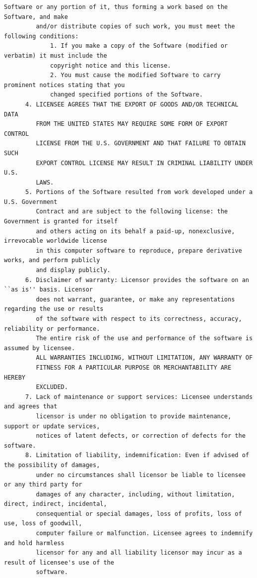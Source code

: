 \begin{lstlisting}[basicstyle=\ttfamily\footnotesize,breaklines=true]
         Software or any portion of it, thus forming a work based on the Software, and make
         and/or distribute copies of such work, you must meet the following conditions:
             1. If you make a copy of the Software (modified or verbatim) it must include the
             copyright notice and this license.
             2. You must cause the modified Software to carry prominent notices stating that you
             changed specified portions of the Software.
      4. LICENSEE AGREES THAT THE EXPORT OF GOODS AND/OR TECHNICAL DATA
         FROM THE UNITED STATES MAY REQUIRE SOME FORM OF EXPORT CONTROL
         LICENSE FROM THE U.S. GOVERNMENT AND THAT FAILURE TO OBTAIN SUCH
         EXPORT CONTROL LICENSE MAY RESULT IN CRIMINAL LIABILITY UNDER U.S.
         LAWS.
      5. Portions of the Software resulted from work developed under a U.S. Government
         Contract and are subject to the following license: the Government is granted for itself
         and others acting on its behalf a paid-up, nonexclusive, irrevocable worldwide license
         in this computer software to reproduce, prepare derivative works, and perform publicly
         and display publicly.
      6. Disclaimer of warranty: Licensor provides the software on an ``as is'' basis. Licensor
         does not warrant, guarantee, or make any representations regarding the use or results
         of the software with respect to its correctness, accuracy, reliability or performance.
         The entire risk of the use and performance of the software is assumed by licensee.
         ALL WARRANTIES INCLUDING, WITHOUT LIMITATION, ANY WARRANTY OF
         FITNESS FOR A PARTICULAR PURPOSE OR MERCHANTABILITY ARE HEREBY
         EXCLUDED.
      7. Lack of maintenance or support services: Licensee understands and agrees that
         licensor is under no obligation to provide maintenance, support or update services,
         notices of latent defects, or correction of defects for the software.
      8. Limitation of liability, indemnification: Even if advised of the possibility of damages,
         under no circumstances shall licensor be liable to licensee or any third party for
         damages of any character, including, without limitation, direct, indirect, incidental,
         consequential or special damages, loss of profits, loss of use, loss of goodwill,
         computer failure or malfunction. Licensee agrees to indemnify and hold harmless
         licensor for any and all liability licensor may incur as a result of licensee's use of the
         software.
\end{lstlisting}

